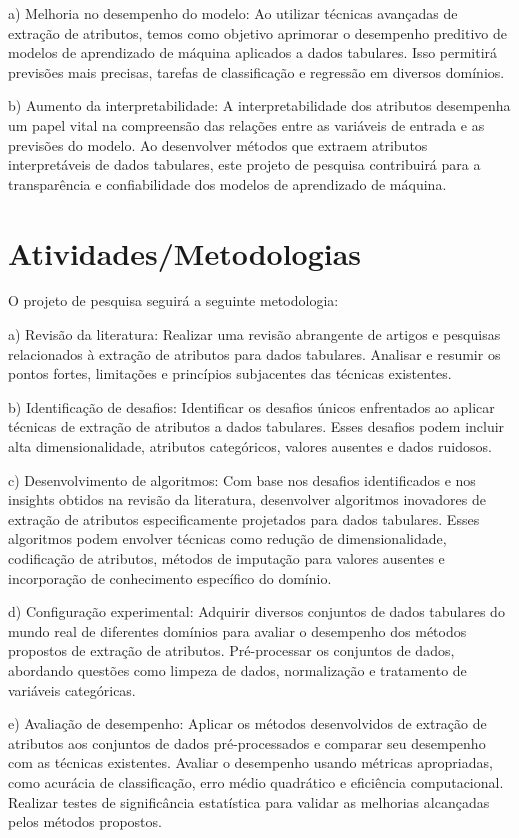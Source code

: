 \documentclass{article}
\begin{document}
a) Melhoria no desempenho do modelo: Ao utilizar técnicas avançadas de extração de atributos, temos como objetivo aprimorar o desempenho preditivo de modelos de aprendizado de máquina aplicados a dados tabulares. Isso permitirá previsões mais precisas, tarefas de classificação e regressão em diversos domínios.

b) Aumento da interpretabilidade: A interpretabilidade dos atributos desempenha um papel vital na compreensão das relações entre as variáveis de entrada e as previsões do modelo. Ao desenvolver métodos que extraem atributos interpretáveis de dados tabulares, este projeto de pesquisa contribuirá para a transparência e confiabilidade dos modelos de aprendizado de máquina.

\section{Atividades/Metodologias}

O projeto de pesquisa seguirá a seguinte metodologia:

a) Revisão da literatura: Realizar uma revisão abrangente de artigos e pesquisas relacionados à extração de atributos para dados tabulares. Analisar e resumir os pontos fortes, limitações e princípios subjacentes das técnicas existentes.

b) Identificação de desafios: Identificar os desafios únicos enfrentados ao aplicar técnicas de extração de atributos a dados tabulares. Esses desafios podem incluir alta dimensionalidade, atributos categóricos, valores ausentes e dados ruidosos.

c) Desenvolvimento de algoritmos: Com base nos desafios identificados e nos insights obtidos na revisão da literatura, desenvolver algoritmos inovadores de extração de atributos especificamente projetados para dados tabulares. Esses algoritmos podem envolver técnicas como redução de dimensionalidade, codificação de atributos, métodos de imputação para valores ausentes e incorporação de conhecimento específico do domínio.

d) Configuração experimental: Adquirir diversos conjuntos de dados tabulares do mundo real de diferentes domínios para avaliar o desempenho dos métodos propostos de extração de atributos. Pré-processar os conjuntos de dados, abordando questões como limpeza de dados, normalização e tratamento de variáveis categóricas.

e) Avaliação de desempenho: Aplicar os métodos desenvolvidos de extração de atributos aos conjuntos de dados pré-processados e comparar seu desempenho com as técnicas existentes. Avaliar o desempenho usando métricas apropriadas, como acurácia de classificação, erro médio quadrático e eficiência computacional. Realizar testes de significância estatística para validar as melhorias alcançadas pelos métodos propostos.
\end{document}
